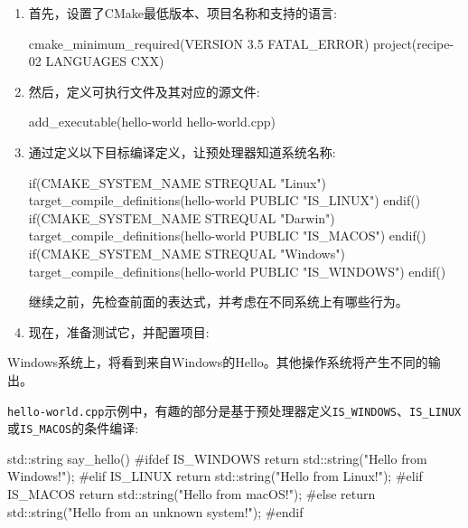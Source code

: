 \begin{enumerate}
\item 首先，设置了CMake最低版本、项目名称和支持的语言:

\begin{codebox}[cmake]
cmake_minimum_required(VERSION 3.5 FATAL_ERROR)
project(recipe-02 LANGUAGES CXX)
\end{codebox}

\item 然后，定义可执行文件及其对应的源文件:

\begin{codebox}[cmake]
add_executable(hello-world hello-world.cpp)
\end{codebox}

\item 通过定义以下目标编译定义，让预处理器知道系统名称:

\begin{codebox}[cmake]
if(CMAKE_SYSTEM_NAME STREQUAL "Linux")
  target_compile_definitions(hello-world PUBLIC "IS_LINUX")
endif()
if(CMAKE_SYSTEM_NAME STREQUAL "Darwin")
  target_compile_definitions(hello-world PUBLIC "IS_MACOS")
endif()
if(CMAKE_SYSTEM_NAME STREQUAL "Windows")
  target_compile_definitions(hello-world PUBLIC "IS_WINDOWS")
endif()
\end{codebox}

继续之前，先检查前面的表达式，并考虑在不同系统上有哪些行为。

\item 现在，准备测试它，并配置项目:


\end{enumerate}

Windows系统上，将看到来自Windows的Hello。其他操作系统将产生不同的输出。


\texttt{hello-world.cpp}示例中，有趣的部分是基于预处理器定义\texttt{IS\_WINDOWS}、\texttt{IS\_LINUX}或\texttt{IS\_MACOS}的条件编译:

\begin{codebox}[cmake]
std::string say_hello() {
#ifdef IS_WINDOWS
  return std::string("Hello from Windows!");
#elif IS_LINUX
  return std::string("Hello from Linux!");
#elif IS_MACOS
  return std::string("Hello from macOS!");
#else
  return std::string("Hello from an unknown system!");
#endif
}
\end{codebox}


